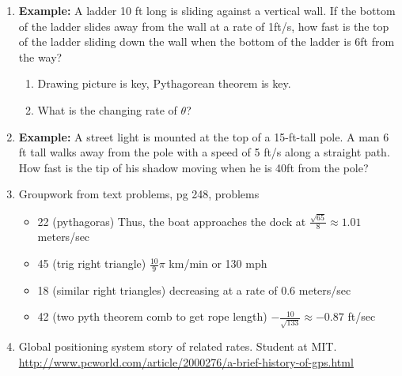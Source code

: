 \documentclass{article}
\begin{document}
\begin{enumerate}
\item {\bf Example:} A ladder 10 ft long is sliding against a vertical wall. If the bottom of the ladder slides away from the wall at a rate of 1ft/s, how fast is the top of the ladder sliding down the wall when the bottom of the ladder is 6ft from the way?
\begin{enumerate}
\item Drawing picture is key, Pythagorean theorem is key.
\item What is the changing rate of $\theta$?
\end{enumerate}
\item {\bf Example:}  A street light is mounted at the top of a 15-ft-tall pole. A man 6 ft tall walks away from the pole with a speed of 5 ft/s along a straight path. How fast is the tip of his shadow moving when he is 40ft from the pole?

\item Groupwork from text problems, pg 248, problems
\begin{itemize}
\item 22 (pythagoras) Thus, the boat approaches the dock at $\frac{\sqrt{65}}{8} \approx 1.01$ meters/sec
\item 45 (trig right triangle) $\frac{10}{9}\pi$ km/min or 130 mph
\item 18 (similar right triangles)  decreasing at a rate of 0.6 meters/sec
\item 42 (two pyth theorem comb to get rope length) $-\frac{10}{\sqrt{133}} \approx -0.87$ ft/sec
\end{itemize}

\item Global positioning system story of related rates. Student at MIT. \url{http://www.pcworld.com/article/2000276/a-brief-history-of-gps.html}
\end{enumerate}

\end{document}
